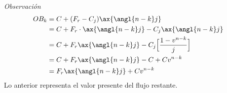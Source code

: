 \textit{Observación}
\begin{align*}
    OB_k &= C+ (F_r-C_j)\ax{\angl{n-k}j}\\
    &= C+F_r\cdot \ax{\angl{n-k}j} - C_j\ax{\angl{n-k}j}\\
    &= C + F_r\ax{\angl{n-k}j} -C_j\Big[\frac{1-v^{n-k}}{j}\Big]\\
    &= C + F_r\ax{\angl{n-k}j} - C+Cv^{n-k}\\
    &= F_r\ax{\angl{n-k}j} + Cv^{n-k}
\end{align*}
Lo anterior representa el valor presente del flujo restante.
\begin{center}
    


\begin{tikzpicture}[x=0.75pt,y=0.75pt,yscale=-1,xscale=1]


\end{tikzpicture}
\end{center}
